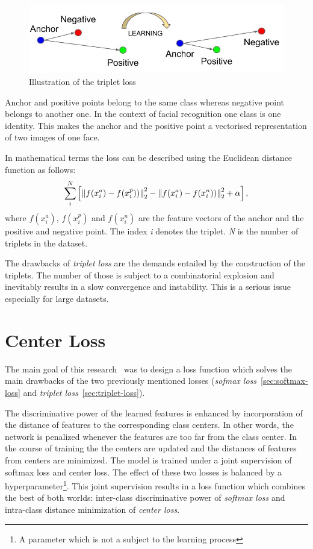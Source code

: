 \begin{figure}[H]
    \centering
    \includegraphics[width=\columnwidth]{images/face-recognition/tripletloss.jpeg}
    \caption{Illustration of the triplet loss~\cite{TripletLoss}}
    \label{fig:tripletloss}
\end{figure}

Anchor and positive points belong to the same class whereas negative point belongs to another one.
In the context of facial recognition one class is one identity.
This makes the anchor and the positive point a vectorised representation of two images of one face.

In mathematical terms the loss can be described using the Euclidean distance function as follows:
\begin{equation}
    \sum_{i}^{N} \left[ \left\lVert f(x_{i}^{a}) - f(x_{i}^{p}))\right\rVert^2_2
    - \left\lVert f(x_{i}^{a}) - f(x_{i}^{n}))\right\rVert^2_2 + \alpha \right],
\end{equation}
where $f(x_{i}^{a})$, $f(x_{i}^{p})$ and $f(x_{i}^{n})$ are the feature vectors of the anchor and the positive and
negative point.
The index \textit{i} denotes the triplet.
\textit{N} is the number of triplets in the dataset.

The drawbacks of \textit{triplet loss} are the demands entailed by the construction of the triplets.
The number of those is subject to a combinatorial explosion and inevitably results in a slow convergence and
instability.
This is a serious issue especially for large datasets.

\section{Center Loss}\label{sec:center-loss}
The main goal of this research~\cite{CenterLoss} was to design a loss function which solves the main drawbacks of
the two previously mentioned losses
(\textit{sofmax loss}~\ref{sec:softmax-loss} and \textit{triplet loss}~\ref{sec:triplet-loss}).

The discriminative power of the learned features is enhanced by incorporation of the distance of features to the
corresponding class centers.
In other words, the network is penalized whenever the features are too far from the class center.
In the course of training the the centers are updated and the distances of features from centers are minimized.
The model is trained under a joint supervision of softmax loss and center loss.
The effect of these two losses is balanced by a hyperparameter\footnote{A parameter which is not a subject to the
learning process}.
This joint supervision results in a loss function which combines the best of both worlds:
inter-class discriminative power of \textit{softmax loss} and intra-class distance minimization of \textit{center loss}.

